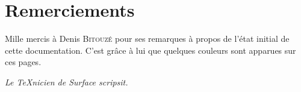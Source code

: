 \documentclass[full]{l3doc}
\begin{document}
 \section{Remerciements}
Mille mercis à Denis \textsc{Bitouzé} pour ses remarques à propos de l'état
initial de cette documentation. C'est grâce à lui que quelques couleurs sont
apparues sur ces pages.


\noindent\hspace*{0.2\textwidth}\hrulefill\hspace*{0.2\textwidth}
\begin{center}
  \textsl{Le TeXnicien de Surface scripsit.}
\end{center}
\noindent\hspace*{0.2\textwidth}\hrulefill\hspace*{0.2\textwidth}

\end{document}
